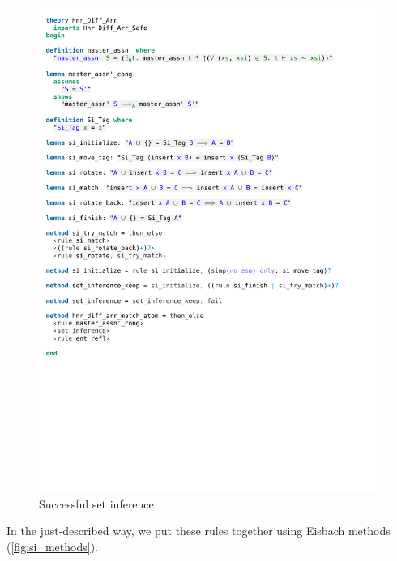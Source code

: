 \begin{figure}[htpb]
    \includegraphics[trim={0 16,5cm 0 12,6cm}, clip, width=1.00\textwidth]{figures/Theory_Hnr_Diff_Arr_SI.pdf}
    \caption[Successful set inference]{Successful set inference}
    \label{fig:si_finish}
\end{figure}

\noindent In the just-described way, we put these rules together using Eisbach methods (\autoref{fig:si_methods}).

